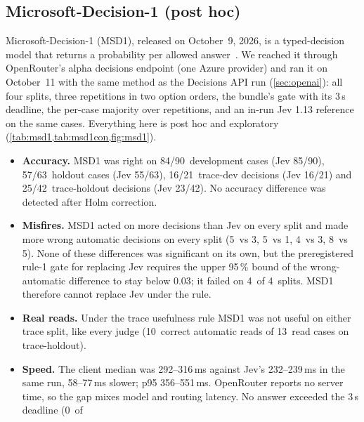 \documentclass[11pt,letterpaper]{article}
\newcommand{\MsDevJevK}{85}
\newcommand{\MsDevJevN}{90}
\newcommand{\MsDevJevWa}{3}
\newcommand{\MsDevMsK}{84}
\newcommand{\MsDevMsN}{90}
\newcommand{\MsDevMsWa}{5}
\newcommand{\MsGapHi}{77}
\newcommand{\MsGapLo}{58}
\newcommand{\MsGateFailN}{4}
\newcommand{\MsHoldoutJevK}{55}
\newcommand{\MsHoldoutJevN}{63}
\newcommand{\MsHoldoutJevWa}{1}
\newcommand{\MsHoldoutMsK}{57}
\newcommand{\MsHoldoutMsN}{63}
\newcommand{\MsHoldoutMsWa}{5}
\newcommand{\MsJevPfiftyHi}{239}
\newcommand{\MsJevPfiftyLo}{232}
\newcommand{\MsNiWa}{0.03}
\newcommand{\MsOverDeadline}{0}
\newcommand{\MsPfiftyHi}{316}
\newcommand{\MsPfiftyLo}{292}
\newcommand{\MsPninetyfiveHi}{551}
\newcommand{\MsPninetyfiveLo}{356}
\newcommand{\MsSplitsN}{4}
\newcommand{\MsTraceDevJevK}{16}
\newcommand{\MsTraceDevJevN}{21}
\newcommand{\MsTraceDevJevWa}{3}
\newcommand{\MsTraceDevMsK}{16}
\newcommand{\MsTraceDevMsN}{21}
\newcommand{\MsTraceDevMsWa}{4}
\newcommand{\MsTraceHoldoutJevK}{23}
\newcommand{\MsTraceHoldoutJevN}{42}
\newcommand{\MsTraceHoldoutJevWa}{5}
\newcommand{\MsTraceHoldoutMsK}{25}
\newcommand{\MsTraceHoldoutMsN}{42}
\newcommand{\MsTraceHoldoutMsWa}{8}
\newcommand{\MsTraceHoldoutReadCases}{13}
\newcommand{\MsTraceHoldoutReads}{10}
\begin{document}
\subsection{Microsoft-Decision-1 (post hoc)}\label{sec:msd1}
Microsoft-Decision-1 (MSD1), released on October~9, 2026, is a typed-decision model that returns a probability per
allowed answer~\cite{msd1router,msd1foundry}. We reached it through OpenRouter's alpha decisions endpoint (one Azure
provider) and ran it on October~11 with the same method as the Decisions API run (\cref{sec:openai}): all four splits,
three repetitions in two option orders, the bundle's gate with its 3\,s deadline, the per-case majority over
repetitions, and an in-run Jev 1.13 reference on the same cases. Everything here is post hoc and exploratory
(\cref{tab:msd1,tab:msd1con,fig:msd1}).
\begin{itemize}
  \item \textbf{Accuracy.} MSD1 was right on \MsDevMsK/\MsDevMsN\ development cases (Jev \MsDevJevK/\MsDevJevN),
    \MsHoldoutMsK/\MsHoldoutMsN\ holdout cases (Jev \MsHoldoutJevK/\MsHoldoutJevN), \MsTraceDevMsK/\MsTraceDevMsN\
    trace-dev decisions (Jev \MsTraceDevJevK/\MsTraceDevJevN) and \MsTraceHoldoutMsK/\MsTraceHoldoutMsN\ trace-holdout
    decisions (Jev \MsTraceHoldoutJevK/\MsTraceHoldoutJevN). No accuracy difference was detected after Holm correction.
  \item \textbf{Misfires.} MSD1 acted on more decisions than Jev on every split and made more wrong automatic decisions
    on every split (\MsDevMsWa\ vs \MsDevJevWa, \MsHoldoutMsWa\ vs \MsHoldoutJevWa, \MsTraceDevMsWa\ vs \MsTraceDevJevWa,
    \MsTraceHoldoutMsWa\ vs \MsTraceHoldoutJevWa). None of these differences was significant on its own, but the
    preregistered rule-1 gate for replacing Jev requires the upper 95\,\% bound of the wrong-automatic difference to
    stay below \MsNiWa; it failed on \MsGateFailN\ of \MsSplitsN\ splits. MSD1 therefore cannot replace Jev under the
    rule.
  \item \textbf{Real reads.} Under the trace usefulness rule MSD1 was not useful on either trace split, like every judge
    (\MsTraceHoldoutReads\ correct automatic reads of \MsTraceHoldoutReadCases\ read cases on trace-holdout).
  \item \textbf{Speed.} The client median was \MsPfiftyLo--\MsPfiftyHi\,ms against Jev's \MsJevPfiftyLo--\MsJevPfiftyHi\,ms in
    the same run, \MsGapLo--\MsGapHi\,ms slower; p95 \MsPninetyfiveLo--\MsPninetyfiveHi\,ms. OpenRouter reports no server
    time, so the gap mixes model and routing latency. No answer exceeded the 3\,s deadline (\MsOverDeadline\ of

\end{itemize}
\end{document}
